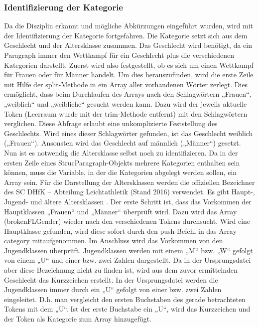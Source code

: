 \subsubsection{Identifizierung der Kategorie}
Da die Disziplin erkannt und mögliche Abkürzungen eingeführt wurden, wird mit der Identifizierung der Kategorie fortgefahren. Die Kategorie setzt sich aus dem Geschlecht und der Altersklasse zusammen. Das Geschlecht wird benötigt, da ein Paragraph immer den Wettkampf für ein Geschlecht plus die verschiedenen Kategorien darstellt. Zuerst wird also festgestellt, ob es sich um einen Wettkampf für Frauen oder für Männer handelt. Um dies herauszufinden, wird die erste Zeile mit Hilfe der split-Methode in ein Array aller vorhandenen Wörter zerlegt. Dies ermöglicht, dass beim Durchlaufen des Arrays nach den Schlagwörtern „Frauen“, „weiblich“ und „weibliche“ gesucht werden kann. Dazu wird der jeweils aktuelle Token (Leerraum wurde mit der trim-Methode entfernt) mit den Schlagwörtern verglichen. Diese Abfrage erlaubt eine unkomplizierte Feststellung des Geschlechts. Wird eines dieser Schlagwörter gefunden, ist das Geschlecht weiblich („Frauen“). Ansonsten wird das Geschlecht auf männlich („Männer“) gesetzt. \\
Nun ist es notwendig die Altersklasse selbst noch zu identifizieren. Da in der ersten Zeile eines StrucParagraph-Objekts mehrere Kategorien enthalten sein können, muss die Variable, in der die Kategorien abgelegt werden sollen, ein Array sein. Für die Darstellung der Altersklassen werden die offiziellen Bezeichner des SC DHfK – Abteilung Leichtathletik (Stand 2016) verwendet. Es gibt Haupt-, Jugend- und ältere Altersklassen \cite{altersklassen}. Der erste Schritt ist, dass das Vorkommen der Hauptklassen „Frauen“ und „Männer“ überprüft wird. Dazu wird das Array (brokenFLGender) wieder nach den verschiedenen Tokens durchsucht. Wird eine Hauptklasse gefunden, wird diese sofort durch den push-Befehl in das Array category mitaufgenommen.
Im Anschluss wird das Vorkommen von den Jugendklassen überprüft. Jugendklassen werden mit einem „M“ bzw. „W“ gefolgt von einem  „U“ und einer bzw. zwei Zahlen dargestellt. Da in der Ursprungsdatei aber diese Bezeichnung nicht zu finden ist, wird aus dem zuvor ermittelnden Geschlecht das Kurzzeichen erstellt. In der Ursprungsdatei werden die Jugendklassen immer durch ein „U“ gefolgt von einer bzw. zwei Zahlen eingeleitet. D.h. man vergleicht den ersten Buchstaben des gerade betrachteten Tokens mit dem „U“. Ist der erste Buchstabe ein „U“, wird das Kurzzeichen und der Token als Kategorie zum Array hinzugefügt. 
